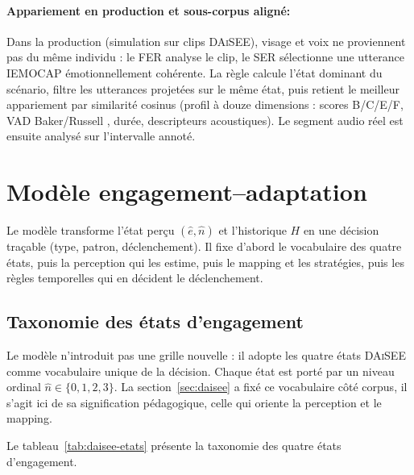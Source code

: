 \paragraph{Appariement en production et sous-corpus aligné:}
\label{subsec:appariement}
\label{subsec:option-a}

Dans la production (simulation sur clips \textsc{DAiSEE}), visage
et voix ne proviennent pas du même individu : le FER analyse le clip, le
SER sélectionne une utterance \textsc{IEMOCAP} émotionnellement cohérente.
La règle calcule
l'état dominant du scénario, filtre
les utterances projetées sur le même état, puis retient le meilleur
appariement par similarité cosinus (profil à douze dimensions :
scores B/C/E/F, VAD Baker/Russell \cite{baker2010better}, durée,
descripteurs acoustiques). Le segment audio réel est ensuite analysé sur
l'intervalle annoté.



\section{Modèle engagement--adaptation}
\label{sec:modele}

Le modèle transforme l'état perçu $(\hat{e}, \hat{n})$ et l'historique
$H$ en une décision traçable (type, patron, déclenchement). Il fixe
d'abord le vocabulaire des quatre états, puis la perception qui les
estime, puis le mapping et les stratégies, puis les règles temporelles
qui en décident le déclenchement.

\subsection{Taxonomie des états d'engagement}
\label{subsec:taxonomie}

Le modèle n'introduit pas une grille nouvelle : il adopte les
quatre états \textsc{DAiSEE} comme vocabulaire unique de la décision.
Chaque état est porté par un niveau ordinal $\hat{n} \in \{0,1,2,3\}$.
La section~\ref{sec:daisee} a fixé ce vocabulaire côté corpus, il
s'agit ici de sa signification pédagogique, celle qui oriente la
perception et le mapping.

Le tableau~\ref{tab:daisee-etats} présente la taxonomie des quatre états d'engagement.

